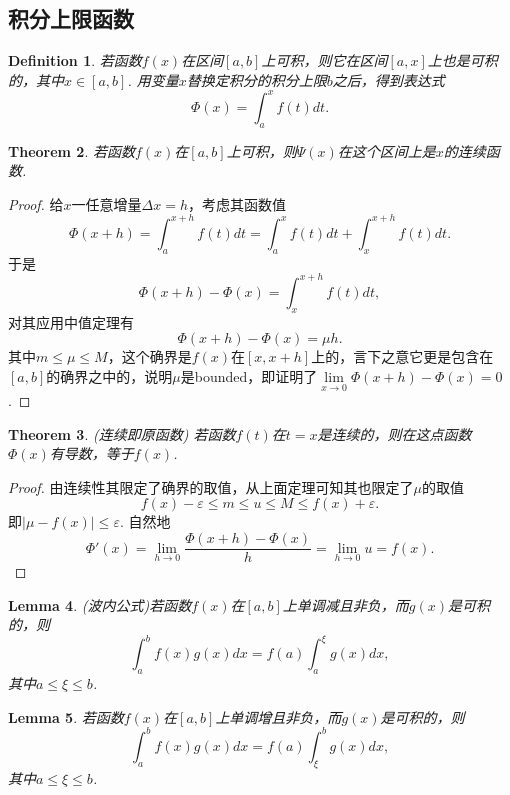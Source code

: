 \documentclass{article}
\newtheorem{theorem}{Theorem}[section]
\newtheorem{lemma}[theorem]{Lemma}
\newtheorem{definition}[theorem]{Definition}
\begin{document}
\subsection{积分上限函数}

\begin{definition}
\rm 若函数$f(x)$在区间$[a,b]$上可积，则它在区间$[a,x]$上也是可积的，其中$x \in [a,b]$. 用变量$x$替换定积分的积分上限$b$之后，得到表达式
$$
\Phi(x) = \int_a^x f(t)dt.
$$
\end{definition}

\begin{theorem}
\rm 若函数$f(x)$在$[a,b]$上可积，则$\Psi(x)$在这个区间上是$x$的连续函数.
\end{theorem}

\begin{proof}
给$x$一任意增量$\Delta x = h$，考虑其函数值
$$
\Phi(x+h) = \int_a^{x+h} f(t)dt = \int_a^x f(t)dt  + \int_x^{x+h} f(t)dt.
$$
于是
$$
\Phi(x+h) - \Phi(x) = \int_x^{x+h} f(t)dt,
$$
对其应用中值定理有
$$
\Phi(x+h) - \Phi(x)  = \mu h.
$$
其中$m \leq \mu \leq M$，这个确界是$f(x)$在$[x,x+h]$上的，言下之意它更是包含在$[a,b]$的确界之中的，说明$\mu$是bounded，即证明了$\lim\limits_{x \to 0}\Phi(x+h) - \Phi(x) = 0$.
\end{proof}

\begin{theorem}
\rm {\color{red} (连续即原函数)} 若函数$f(t)$在$t=x$是连续的，则在这点函数$\Phi(x)$有导数，等于$f(x)$.
\end{theorem}

\begin{proof}
由连续性其限定了确界的取值，从上面定理可知其也限定了$\mu$的取值
$$
f(x) - \varepsilon \leq m  \leq u \leq M \leq f(x) + \varepsilon. 
$$
即$|\mu-f(x)| \leq \varepsilon$. 自然地
$$
\Phi'(x) = \lim\limits_{h \rightarrow 0} \frac{\Phi(x+h)-\Phi(x)}{h} = \lim\limits_{h \rightarrow 0} u = f(x).
$$
\end{proof}

\begin{lemma}
\rm {\color{red} (波内公式)}若函数$f(x)$在$[a,b]$上单调减且非负，而$g(x)$是可积的，则
$$
\int_a^b f(x)g(x)dx = f(a) \int_a^\xi g(x)dx,
$$
其中$a \leq \xi \leq b$.
\end{lemma}

\begin{lemma}
\rm 若函数$f(x)$在$[a,b]$上单调增且非负，而$g(x)$是可积的，则
$$
\int_a^b f(x)g(x)dx = f(a) \int_\xi^b g(x)dx,
$$
其中$a \leq \xi \leq b$.
\end{lemma}
\end{document}
